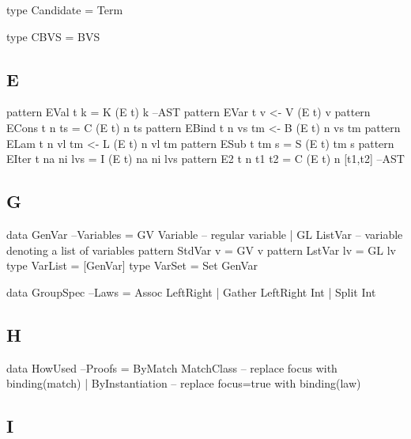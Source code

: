 \begin{code}
type Candidate = Term
\end{code}

\begin{code}
type CBVS = BVS
\end{code}


\subsection{E}


\begin{code}
pattern EVal t k           =  K (E t) k                                  --AST
pattern EVar t v          <-  V (E t) v
pattern ECons t n ts       =  C (E t) n ts
pattern EBind t n vs tm   <-  B (E t) n vs tm
pattern ELam t n vl tm    <-  L (E t) n vl tm
pattern ESub t tm s        =  S (E t) tm s
pattern EIter t na ni lvs  =  I (E t) na ni lvs
pattern E2 t n t1 t2       =  C (E t) n [t1,t2]                          --AST
\end{code}


\subsection{G}

\begin{code}
data GenVar                                                        --Variables
 = GV Variable -- regular variable
 | GL ListVar  -- variable denoting a list of variables
pattern StdVar v = GV v
pattern LstVar lv = GL lv
type VarList = [GenVar]
type VarSet = Set GenVar
\end{code}

\begin{code}
data GroupSpec                                                          --Laws
  = Assoc LeftRight
  | Gather LeftRight Int
  | Split Int
\end{code}

\subsection{H}

\begin{code}
data HowUsed                                                          --Proofs
  = ByMatch MatchClass  -- replace focus with binding(match)
  | ByInstantiation     -- replace focus=true with binding(law)
\end{code}

\subsection{I}

